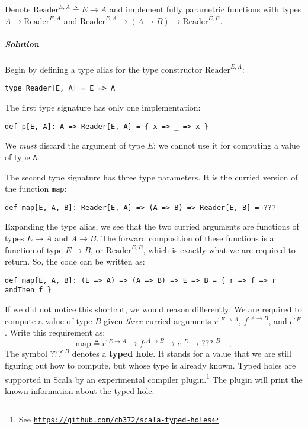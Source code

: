Denote $\text{Reader}^{E,A}\triangleq E\rightarrow A$ and implement
fully parametric functions with types $A\rightarrow\text{Reader}^{E,A}$
and $\text{Reader}^{E,A}\rightarrow(A\rightarrow B)\rightarrow\text{Reader}^{E,B}$.

\subparagraph{Solution}

Begin by defining a type alias for the type constructor $\text{Reader}^{E,A}$:
\begin{lstlisting}
type Reader[E, A] = E => A
\end{lstlisting}
The first type signature has only one implementation:
\begin{lstlisting}
def p[E, A]: A => Reader[E, A] = { x => _ => x }
\end{lstlisting}
We \emph{must} discard the argument of type $E$; we cannot use it
for computing a value of type \lstinline!A!.

The second type signature has three type parameters. It is the curried
version of the function \lstinline!map!:
\begin{lstlisting}
def map[E, A, B]: Reader[E, A] => (A => B) => Reader[E, B] = ???
\end{lstlisting}
Expanding the type alias, we see that the two curried arguments are
functions of types $E\rightarrow A$ and $A\rightarrow B$. The forward
composition of these functions is a function of type $E\rightarrow B$,
or $\text{Reader}^{E,B}$, which is exactly what we are required to
return. So, the code can be written as:

\begin{lstlisting}
def map[E, A, B]: (E => A) => (A => B) => E => B = { r => f => r andThen f }
\end{lstlisting}
If we did not notice this shortcut, we would reason differently: We
are required to compute a value of type $B$ given \emph{three} curried
arguments $r^{:E\rightarrow A}$, $f^{:A\rightarrow B}$, and $e^{:E}$.
Write this requirement as:
\[
\text{map}\triangleq r^{:E\rightarrow A}\rightarrow f^{:A\rightarrow B}\rightarrow e^{:E}\rightarrow???^{:B}\quad,
\]
The symbol $\text{???}^{:B}$ denotes a \textbf{typed
hole}. It stands for a value that we are still figuring out how to
compute, but whose type is already known. Typed holes are supported
in Scala by an experimental compiler plugin.\footnote{See \texttt{\href{https://github.com/cb372/scala-typed-holes}{https://github.com/cb372/scala-typed-holes}}}
The plugin will print the known information about the typed hole.

